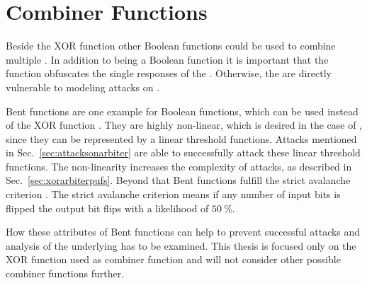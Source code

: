 
\section{Combiner Functions}
\label{sec:combinerfunctions}

Beside the \ac{XOR} function other Boolean functions could be used to combine multiple \apuf.
In addition to being a Boolean function it is important that the function obfuscates the single responses of the \apufs. 
Otherwise, the \apufs are directly vulnerable to modeling attacks on \apufs.

Bent functions are one example for Boolean functions, which can be used instead of the \ac{XOR} function \cite{Adams1990Thedesign,Forre1990Thedefinition,Seberry1993Highlycriterion}.
They are highly non-linear, which is desired in the case of \apufs, since they can be represented by a linear threshold functions.
Attacks mentioned in Sec.\ \ref{sec:attacksonarbiter} are able to successfully attack these linear threshold functions.
The non-linearity increases the complexity of attacks, as described in Sec.\ \ref{sec:xorarbiterpufs}. %
Beyond that Bent functions fulfill the strict avalanche criterion \cite{Feistel1973Cryptographyprivacy}.
The strict avalanche criterion means if any number of input bits is flipped the output bit flips with a likelihood of $50\ \%$.

How these attributes of Bent functions can help to prevent successful attacks and analysis of the underlying \apufs has to be examined.
This thesis is focused only on the \ac{XOR} function used as combiner function and will not consider other possible combiner functions further.

